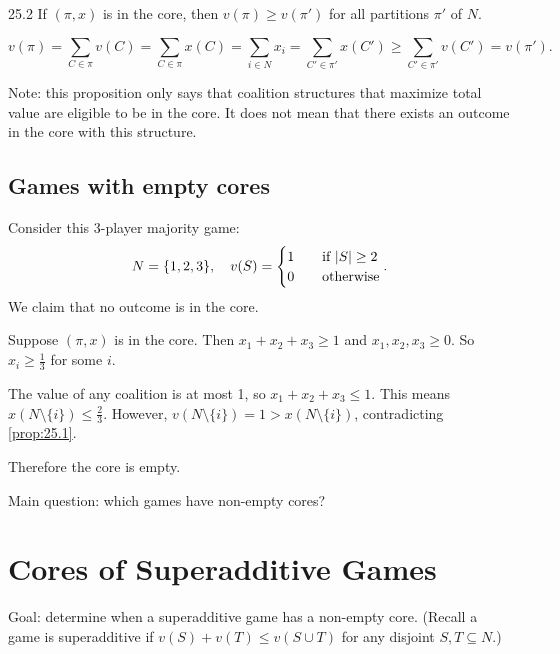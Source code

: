 \documentclass[12pt,letterpaper]{report}
\begin{document}
\begin{prop}{}{25.2}
  If $(\pi, x)$ is in the core, then $v(\pi) \geq v(\pi')$ for all partitions $\pi'$ of $N$.
\end{prop}

\begin{thmproof}
  \[
    v(\pi) = \sum_{C \in \pi} v(C) = \sum_{C \in \pi} x(C) = \sum_{i \in N} x_i
      = \sum_{C' \in \pi'} x(C') \geq \sum_{C' \in \pi'} v(C') = v(\pi').
  \]
\end{thmproof}

Note: this proposition only says that coalition structures that maximize total value are eligible
to be in the core.
It does not mean that there exists an outcome in the core with this structure.

\subsection{Games with empty cores}

\begin{ex}
  Consider this 3-player majority game:
  \[
    N = \{1, 2, 3\}, \quad v(S) = \begin{cases}
      1 \quad & \text{if } \lvert S\rvert \geq 2 \\
      0 & \text{otherwise} \\
    \end{cases}.
  \]
  We claim that no outcome is in the core.

  Suppose $(\pi, x)$ is in the core.
  Then $x_1 + x_2 + x_3 \geq 1$ and $x_1, x_2, x_3 \geq 0$.
  So $x_i \geq \frac{1}{3}$ for some $i$.

  The value of any coalition is at most 1, so $x_1 + x_2 + x_3 \leq 1$.
  This means $x(N \setminus \{i\}) \leq \frac{2}{3}$.
  However, $v(N \setminus \{i\}) = 1 > x(N \setminus \{i\})$, contradicting \cref{prop:25.1}.

  Therefore the core is empty.
\end{ex}

Main question: which games have non-empty cores?

\section{Cores of Superadditive Games}

Goal: determine when a superadditive game has a non-empty core.
(Recall a game is superadditive if $v(S) + v(T) \leq v(S \cup T)$ for any disjoint
$S, T \subseteq N$.)
\end{document}
